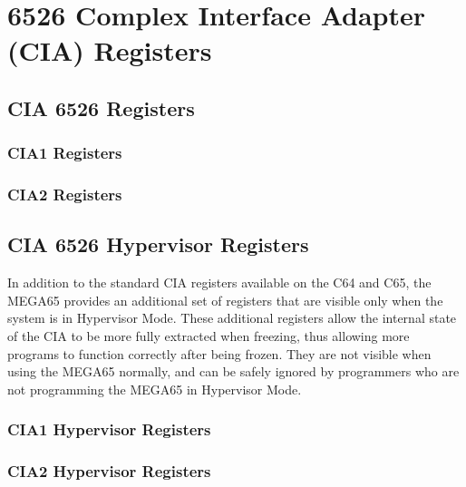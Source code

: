 \chapter{6526 Complex Interface Adapter (CIA) Registers}

\section{CIA 6526 Registers}

\subsection*{CIA1 Registers}


\subsection*{CIA2 Registers}


\section{CIA 6526 Hypervisor Registers}

In addition to the standard CIA registers available on the C64 and C65, the MEGA65
provides an additional set of registers that are visible only when the system is in
Hypervisor Mode. These additional registers allow the internal state of the CIA to
be more fully extracted when freezing, thus allowing more programs to function
correctly after being frozen.  They are not visible when using the MEGA65 normally,
and can be safely ignored by programmers who are not programming the MEGA65 in
Hypervisor Mode.

\subsection*{CIA1 Hypervisor Registers}


\subsection*{CIA2 Hypervisor Registers}

